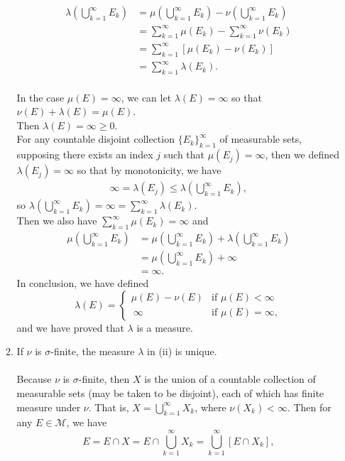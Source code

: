 \begin{enumerate}
\begin{enumerate}[label=(\roman*),align=left]
		\begin{align*}
			\lambda\left(\bigcup_{k=1}^\infty E_k\right)&=\mu\left(\bigcup_{k=1}^\infty E_k\right)-\nu\left(\bigcup_{k=1}^\infty E_k\right)\\
			&=\sum_{k=1}^\infty\mu(E_k)-\sum_{k=1}^\infty\nu(E_k)\\
			&=\sum_{k=1}^\infty[\mu(E_k)-\nu(E_k)]\\
			&=\sum_{k=1}^\infty\lambda(E_k).
		\end{align*}
		\\In the case $\mu(E)=\infty$, we can let $\lambda(E) = \infty$ so that $\nu(E)+\lambda(E)=\mu(E)$.
		\\Then $\lambda(E)=\infty\ge0$.
		\\For any countable disjoint collection $\{E_k\}_{k=1}^\infty$ of measurable sets, supposing there exists an index $j$ such that $\mu(E_j)=\infty$, then we defined $\lambda(E_j) = \infty$ so that by monotonicity, we have
		\begin{align*}
			\infty=\lambda(E_j)\le\lambda\left(\bigcup_{k=1}^\infty E_k\right),
		\end{align*}
		so $\lambda\left(\bigcup_{k=1}^\infty E_k\right)=\infty=\sum_{k=1}^\infty\lambda(E_k)$.
		\\Then we also have $\sum_{k=1}^\infty\mu(E_k)=\infty$ and 
		\begin{align*}
			\mu\left(\bigcup_{k=1}^\infty E_k\right)&=\mu\left(\bigcup_{k=1}^\infty E_k\right)+\lambda\left(\bigcup_{k=1}^\infty E_k\right)\\
			&=\mu\left(\bigcup_{k=1}^\infty E_k\right)+\infty\\
			&=\infty.
		\end{align*}
		In conclusion, we have defined
		\[
		\lambda(E)=
		\begin{cases}
			\mu(E)-\nu(E)&\text{if }\mu(E)<\infty\\\
			\infty&\text{if }\mu(E)=\infty,
		\end{cases}
		\]
		and we have proved that $\lambda$ is a measure.
		\item If $\nu$ is $\sigma$-finite, the measure $\lambda$ in (ii) is unique.\\
		\\Because $\nu$ is $\sigma$-finite, then $X$ is the union of a countable collection of measurable sets (may be taken to be disjoint), each of which has finite measure under $\nu$.
		That is, $X=\bigcup_{k=1}^\infty X_k$, where $\nu(X_k)<\infty$.
		Then for any $E\in\mathcal{M}$, we have 
		\[
			E=E\cap X = E\cap \bigcup_{k=1}^\infty X_k = \bigcup_{k=1}^\infty[E\cap X_k],
\]
\end{enumerate}
\end{enumerate}
